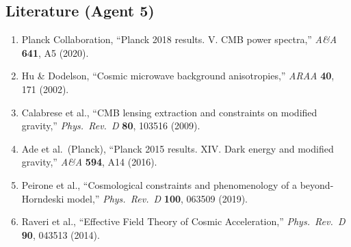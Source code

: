 \documentclass[11pt,a4paper]{article}
\begin{document}
\subsection{Literature (Agent 5)}

\begin{enumerate}
\item Planck Collaboration, ``Planck 2018 results. V. CMB power spectra,'' \textit{A\&A} \textbf{641}, A5 (2020).
\item Hu \& Dodelson, ``Cosmic microwave background anisotropies,'' \textit{ARAA} \textbf{40}, 171 (2002).
\item Calabrese et al., ``CMB lensing extraction and constraints on modified gravity,'' \textit{Phys.\ Rev.\ D} \textbf{80}, 103516 (2009).
\item Ade et al.\ (Planck), ``Planck 2015 results. XIV. Dark energy and modified gravity,'' \textit{A\&A} \textbf{594}, A14 (2016).
\item Peirone et al., ``Cosmological constraints and phenomenology of a beyond-Horndeski model,'' \textit{Phys.\ Rev.\ D} \textbf{100}, 063509 (2019).
\item Raveri et al., ``Effective Field Theory of Cosmic Acceleration,'' \textit{Phys.\ Rev.\ D} \textbf{90}, 043513 (2014).
\end{enumerate}
\end{document}
